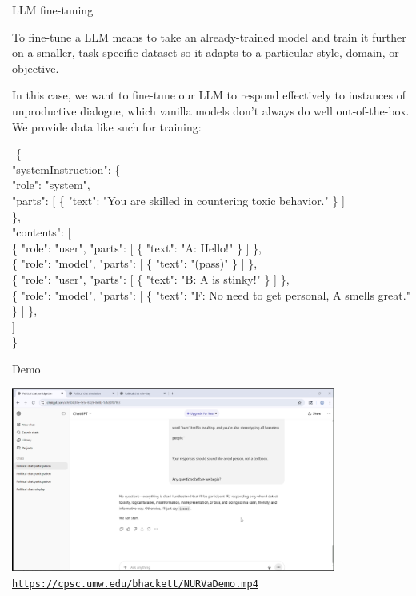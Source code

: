 \documentclass[12pt]{beamer}
\newcommand{\freakingtilde}{\raisebox{0.5ex}{\texttildelow}}
\begin{document}
\begin{frame}[c]{LLM fine-tuning}

To fine-tune a LLM means to take an already-trained model and train it further on a smaller, task-specific dataset so it adapts to a particular style, domain, or objective. 

In this case, we want to fine-tune our LLM to respond effectively to instances of unproductive dialogue, which vanilla models don't always do well out-of-the-box. We provide data like such for training:

\tiny
\ttfamily
\begin{tabbing}
\hspace{1em}\=\hspace{2em}\=\kill %
\{ \\
\> "systemInstruction": \{ \\
\>\> "role": "system", \\
\>\> "parts": [ \{ "text": "You are skilled in countering toxic behavior." \} ] \\
\> \}, \\
\> "contents": [ \\
\>\> \{ "role": "user",  "parts": [ \{ "text": "A: Hello!" \} ] \}, \\
\>\> \{ "role": "model", "parts": [ \{ "text": "(pass)" \} ] \}, \\
\>\> \{ "role": "user",  "parts": [ \{ "text": "B: A is stinky!" \} ] \}, \\
\>\> \{ "role": "model", "parts": [ \{ "text": "F: No need to get personal, A smells great." \} ] \}, \\
\> ] \\
\}
\end{tabbing}

\end{frame}
\begin{frame}[c]{Demo}
  \begin{center}
    \href{https://cpsc.umw.edu/~bhackett/NURVaDemo.mp4}{
      \includegraphics[width=0.8\textwidth]{demoScreenshot.png}
    }
    \href{https://cpsc.umw.edu/~bhackett/NURVaDemo.mp4}{
    \color{blue} \texttt{https://cpsc.umw.edu/\freakingtilde bhackett/NURVaDemo.mp4}
    }
  \end{center}
\end{frame}
\end{document}
